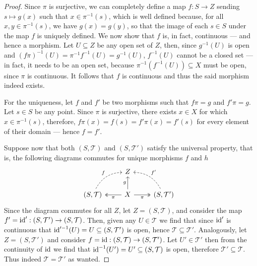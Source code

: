 \begin{proof}
Since \(\pi\) is surjective, we can completely define a map \(f: S \to Z\) sending
\(s \mapsto g(x)\) such that \(x \in \pi^{-1}(s)\), which is well defined because, for
all \(x, y \in \pi^{-1}(s)\), we have \(g(x) = g(y)\), so that the image of each
\(s \in S\) under the map \(f\) is uniquely defined. We now show that \(f\) is,
in fact, continuous --- and hence a morphism. Let \(U \subseteq Z\) be any open set of
\(Z\), then, since \(g^{-1}(U)\) is open and \((f \pi)^{-1}(U) = \pi^{-1}
f^{-1}(U) = g^{-1}(U)\), \(f^{-1}(U)\) cannot be a closed set --- in fact, it
needs to be an open set, because \(\pi^{-1}(f^{-1}(U)) \subseteq X\) must be open, since
\(\pi\) is continuous. It follows that \(f\) is continuous and thus the said
morphism indeed exists.

For the uniqueness, let \(f\) and \(f'\) be two morphisms such that \(f\pi = g\)
and \(f'\pi = g\). Let \(s \in S\) be any point. Since \(\pi\) is surjective, there
exists \(x \in X\) for which \(x \in \pi^{-1}(s)\), therefore, \(f \pi(x) = f(s) =
f'\pi(x) = f'(s)\) for every element of their domain --- hence \(f = f'\).

Suppose now that both \((S, \mathcal T)\) and \((S, \mathcal T')\) satisfy the
universal property, that is, the following diagrams commutes for unique
morphisms \(f\) and \(h\)
\[
  \begin{tikzcd}
    &Z & \\
    (S, \mathcal T) \ar[ur, dashed, bend left, "f"]
    &X \ar[l, two heads, "\pi"] \ar[r, swap, two heads, "\pi"] \ar[u, "g"]
    &(S, \mathcal T') \ar[ul, dashed, bend right, swap, "f'"]
  \end{tikzcd}
\]
Since the diagram commutes for all \(Z\), let \(Z = (S, \mathcal T)\), and
consider the map \(f' = \operatorname{id}': (S, \mathcal T') \to (S, \mathcal
T)\). Then, given any \(U \in \mathcal T\) we find that since \(\operatorname{id}'\) is
continuous that \(\operatorname{id}'^{-1}(U) = U \subseteq (S, \mathcal T')\) is open, hence
\(\mathcal T \subseteq \mathcal T'\). Analogously, let \(Z = (S, \mathcal T')\) and
consider \(f = \operatorname{id}: (S, \mathcal T) \to (S, \mathcal T')\). Let \(U' \in \mathcal
T'\) then from the continuity of \(\operatorname{id}\) we find that \(\operatorname{id}^{-1}(U') = U' \subseteq
(S, \mathcal T)\) is open, therefore \(\mathcal T' \subseteq \mathcal T\). Thus indeed
\(\mathcal T = \mathcal T'\) as wanted.
\end{proof}
